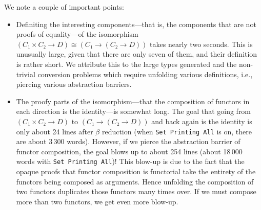 We note a couple of important points:
\begin{itemize}
\item
  Definiting the interesting components---that is, the components that are not proofs of equality---of the isomorphism $(C₁ × C₂ → D) ≅ (C₁ → (C₂ → D))$ takes nearly two seconds.
  This is unusually large, given that there are only seven of them, and their definition is rather short.
  We attribute this to the large types generated and the non-trivial conversion problems which require unfolding various definitions, i.e., piercing various abstraction barriers.
\item
  The proofy parts of the isomorphism---that the composition of functors in each direction is the identity---is somewhat long.
  The goal that going from $(C₁ × C₂ → D)$ to $(C₁ → (C₂ → D))$ and back again is the identity is only about 24 lines after $\beta$ reduction (when \texttt{Set Printing All} is on, there are about 3\,300 words).
  However, if we pierce the abstraction barrier of functor composition, the goal blows up to about 254 lines (about 18\,000 words with \texttt{Set Printing All})!
  This blow-up is due to the fact that the opaque proofs that functor composition is functorial take the entirety of the functors being composed as arguments.
  Hence unfolding the composition of two functors duplicates those functors many times over.
  If we must compose more than two functors, we get even more blow-up.
\end{itemize}



